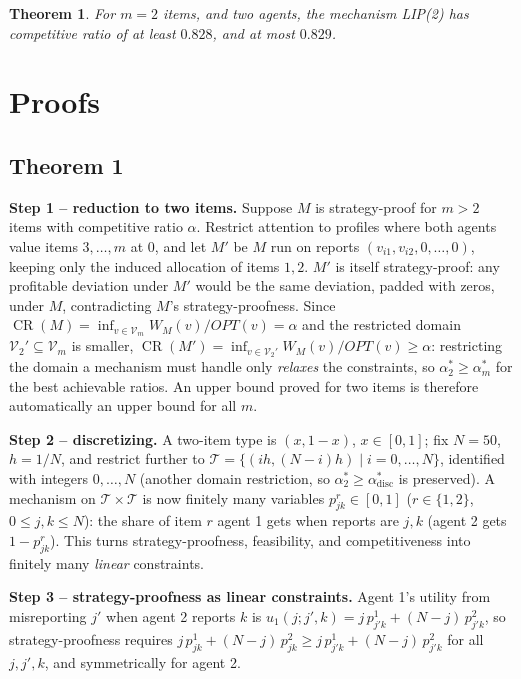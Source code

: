 \documentclass{article}
\newtheorem{theorem}{Theorem}
\begin{document}
\begin{theorem}
 For $m=2$ items, and two agents, the mechanism LIP(2) has competitive ratio of at least $0.828$, and at most $0.829$.
\end{theorem}

\section{Proofs}
\subsection{Theorem 1}
\textbf{Step 1 -- reduction to two items.}
Suppose $M$ is strategy-proof for $m>2$ items with competitive ratio
$\alpha$. Restrict attention to profiles where both agents value items
$3,\ldots,m$ at $0$, and let $M'$ be $M$ run on reports
$(v_{i1},v_{i2},0,\ldots,0)$, keeping only the induced allocation of items
$1,2$. $M'$ is itself strategy-proof: any profitable deviation under $M'$
would be the same deviation, padded with zeros, under $M$, contradicting
$M$'s strategy-proofness. Since $\operatorname{CR}(M)=\inf_{v\in\mathcal V_m} W_M(v)/OPT(v)=\alpha$
and the restricted domain $\mathcal V_2'\subseteq\mathcal V_m$ is smaller,
$\operatorname{CR}(M')=\inf_{v\in\mathcal V_2'}W_M(v)/OPT(v)\ge\alpha$: restricting
the domain a mechanism must handle only \emph{relaxes} the constraints, so
$\alpha_2^*\ge\alpha_m^*$ for the best achievable ratios. An upper bound
proved for two items is therefore automatically an upper bound for all $m$.

\textbf{Step 2 -- discretizing.}
A two-item type is $(x,1-x)$, $x\in[0,1]$; fix $N=50$, $h=1/N$, and restrict
further to $\mathcal T=\{(ih,(N-i)h)\mid i=0,\dots,N\}$, identified with
integers $0,\dots,N$ (another domain restriction, so $\alpha_2^*\ge\alpha_{\mathrm{disc}}^*$
is preserved). A mechanism on $\mathcal T\times\mathcal T$ is now finitely
many variables $p^r_{jk}\in[0,1]$ ($r\in\{1,2\}$, $0\le j,k\le N$): the share
of item $r$ agent 1 gets when reports are $j,k$ (agent 2 gets $1-p^r_{jk}$).
This turns strategy-proofness, feasibility, and competitiveness into finitely
many \emph{linear} constraints.

\textbf{Step 3 -- strategy-proofness as linear constraints.}
Agent 1's utility from misreporting $j'$ when agent 2 reports $k$ is
$u_1(j;j',k)=j\,p^1_{j'k}+(N-j)\,p^2_{j'k}$, so strategy-proofness requires
$j\,p^1_{jk}+(N-j)\,p^2_{jk}\ge j\,p^1_{j'k}+(N-j)\,p^2_{j'k}$ for all
$j,j',k$, and symmetrically for agent 2.
\end{document}
